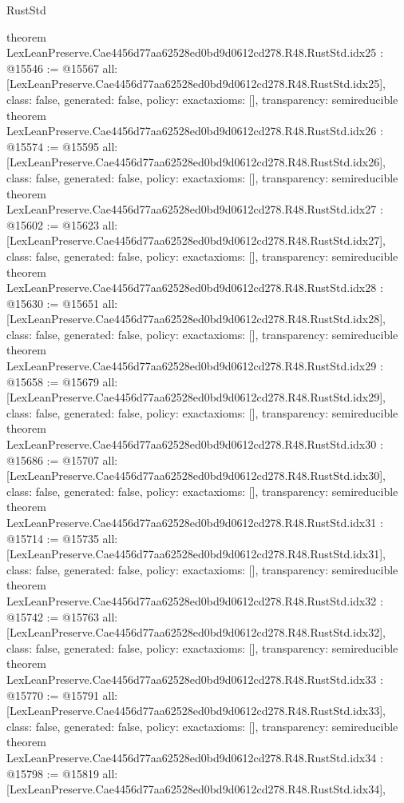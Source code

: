 \begin{lexlean}{RustStd}
\begin{coremodule}
{}
theorem LexLeanPreserve.Cae4456d77aa62528ed0bd9d0612cd278.R48.RustStd.idx25 : @15546 := @15567 {
  all: [LexLeanPreserve.Cae4456d77aa62528ed0bd9d0612cd278.R48.RustStd.idx25],
  class: false,
  generated: false,
  policy: exact{axioms: []},
  transparency: semireducible
}
theorem LexLeanPreserve.Cae4456d77aa62528ed0bd9d0612cd278.R48.RustStd.idx26 : @15574 := @15595 {
  all: [LexLeanPreserve.Cae4456d77aa62528ed0bd9d0612cd278.R48.RustStd.idx26],
  class: false,
  generated: false,
  policy: exact{axioms: []},
  transparency: semireducible
}
theorem LexLeanPreserve.Cae4456d77aa62528ed0bd9d0612cd278.R48.RustStd.idx27 : @15602 := @15623 {
  all: [LexLeanPreserve.Cae4456d77aa62528ed0bd9d0612cd278.R48.RustStd.idx27],
  class: false,
  generated: false,
  policy: exact{axioms: []},
  transparency: semireducible
}
theorem LexLeanPreserve.Cae4456d77aa62528ed0bd9d0612cd278.R48.RustStd.idx28 : @15630 := @15651 {
  all: [LexLeanPreserve.Cae4456d77aa62528ed0bd9d0612cd278.R48.RustStd.idx28],
  class: false,
  generated: false,
  policy: exact{axioms: []},
  transparency: semireducible
}
theorem LexLeanPreserve.Cae4456d77aa62528ed0bd9d0612cd278.R48.RustStd.idx29 : @15658 := @15679 {
  all: [LexLeanPreserve.Cae4456d77aa62528ed0bd9d0612cd278.R48.RustStd.idx29],
  class: false,
  generated: false,
  policy: exact{axioms: []},
  transparency: semireducible
}
theorem LexLeanPreserve.Cae4456d77aa62528ed0bd9d0612cd278.R48.RustStd.idx30 : @15686 := @15707 {
  all: [LexLeanPreserve.Cae4456d77aa62528ed0bd9d0612cd278.R48.RustStd.idx30],
  class: false,
  generated: false,
  policy: exact{axioms: []},
  transparency: semireducible
}
theorem LexLeanPreserve.Cae4456d77aa62528ed0bd9d0612cd278.R48.RustStd.idx31 : @15714 := @15735 {
  all: [LexLeanPreserve.Cae4456d77aa62528ed0bd9d0612cd278.R48.RustStd.idx31],
  class: false,
  generated: false,
  policy: exact{axioms: []},
  transparency: semireducible
}
theorem LexLeanPreserve.Cae4456d77aa62528ed0bd9d0612cd278.R48.RustStd.idx32 : @15742 := @15763 {
  all: [LexLeanPreserve.Cae4456d77aa62528ed0bd9d0612cd278.R48.RustStd.idx32],
  class: false,
  generated: false,
  policy: exact{axioms: []},
  transparency: semireducible
}
theorem LexLeanPreserve.Cae4456d77aa62528ed0bd9d0612cd278.R48.RustStd.idx33 : @15770 := @15791 {
  all: [LexLeanPreserve.Cae4456d77aa62528ed0bd9d0612cd278.R48.RustStd.idx33],
  class: false,
  generated: false,
  policy: exact{axioms: []},
  transparency: semireducible
}
theorem LexLeanPreserve.Cae4456d77aa62528ed0bd9d0612cd278.R48.RustStd.idx34 : @15798 := @15819 {
  all: [LexLeanPreserve.Cae4456d77aa62528ed0bd9d0612cd278.R48.RustStd.idx34],
}
\end{coremodule}
\end{lexlean}

